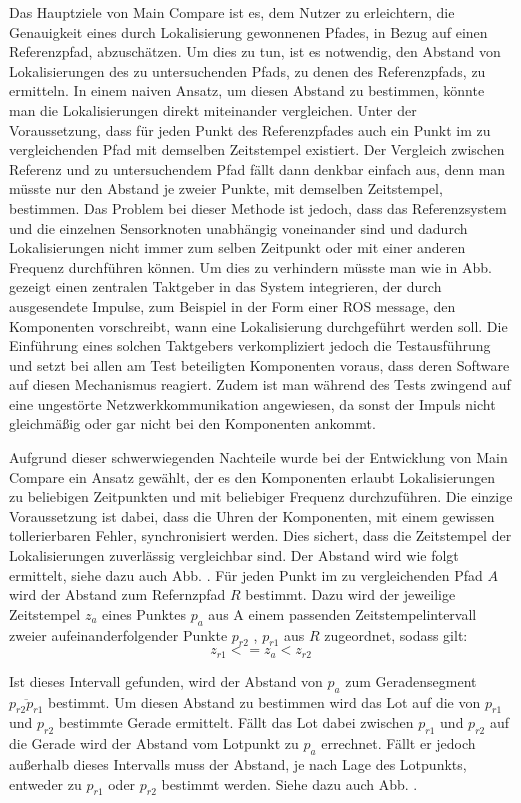 Das Hauptziele von Main Compare ist es, dem Nutzer zu erleichtern, die
Genauigkeit eines durch Lokalisierung gewonnenen Pfades, in Bezug auf einen
Referenzpfad, abzuschätzen. Um dies zu tun, ist es notwendig, den Abstand von
Lokalisierungen des zu untersuchenden Pfads, zu denen des Referenzpfads, zu
ermitteln. In einem naiven Ansatz, um diesen Abstand zu bestimmen, könnte man die Lokalisierungen direkt
miteinander vergleichen. Unter der Voraussetzung, dass für jeden Punkt des Referenzpfades auch
ein Punkt im zu vergleichenden Pfad mit demselben Zeitstempel existiert. Der
Vergleich zwischen Referenz und zu untersuchendem Pfad fällt dann denkbar einfach aus, denn man müsste nur den Abstand je
zweier Punkte, mit demselben Zeitstempel, bestimmen.
Das Problem bei dieser Methode ist jedoch, dass das Referenzsystem und die
einzelnen Sensorknoten unabhängig voneinander sind und dadurch Lokalisierungen
nicht immer zum selben Zeitpunkt oder mit einer anderen Frequenz durchführen 
können. Um dies zu verhindern müsste man wie in Abb. gezeigt einen zentralen
Taktgeber in das System integrieren, der durch ausgesendete Impulse, zum
Beispiel in der Form einer ROS message, den Komponenten vorschreibt,
wann eine Lokalisierung durchgeführt werden soll.
Die Einführung eines solchen Taktgebers verkompliziert jedoch die
Testausführung und setzt bei allen am Test beteiligten Komponenten voraus, dass
deren Software auf diesen Mechanismus reagiert. Zudem ist man während des Tests
zwingend auf eine ungestörte Netzwerkkommunikation angewiesen, da sonst der
Impuls nicht gleichmäßig oder gar nicht bei den Komponenten ankommt.

Aufgrund dieser schwerwiegenden Nachteile wurde bei der Entwicklung von Main
Compare ein Ansatz gewählt, der es den Komponenten erlaubt Lokalisierungen zu
beliebigen Zeitpunkten und mit beliebiger Frequenz durchzuführen. Die einzige
Voraussetzung ist dabei, dass die Uhren der Komponenten, mit einem gewissen
tollerierbaren Fehler, synchronisiert werden. Dies sichert, dass die Zeitstempel der
Lokalisierungen zuverlässig vergleichbar sind. Der Abstand wird wie folgt
ermittelt, siehe dazu auch Abb. . Für jeden Punkt im zu vergleichenden Pfad $A$
wird der Abstand zum Refernzpfad $R$ bestimmt. Dazu wird der jeweilige
Zeitstempel $z_a$ eines Punktes $p_a$ aus A einem passenden
Zeitstempelintervall zweier aufeinanderfolgender Punkte $p_{r2}$ , $p_{r1}$ aus $R$ zugeordnet, sodass
gilt:
\[
z_{r1} <= z_a < z_{r2}
\]

Ist dieses Intervall gefunden, wird der Abstand von $p_a$ zum Geradensegment
$\overline{p_{r2} p_{r1}}$ bestimmt. Um diesen Abstand zu bestimmen wird das
Lot auf die von $p_{r1}$ und $p_{r2}$ bestimmte Gerade ermittelt. Fällt das Lot
dabei zwischen $p_{r1}$ und $p_{r2}$ auf die Gerade wird der Abstand vom
Lotpunkt zu $p_a$ errechnet. Fällt er jedoch außerhalb dieses Intervalls muss
der Abstand, je nach Lage des Lotpunkts, entweder zu $p_{r1}$ oder $p_{r2}$
bestimmt werden. Siehe dazu auch Abb. .

